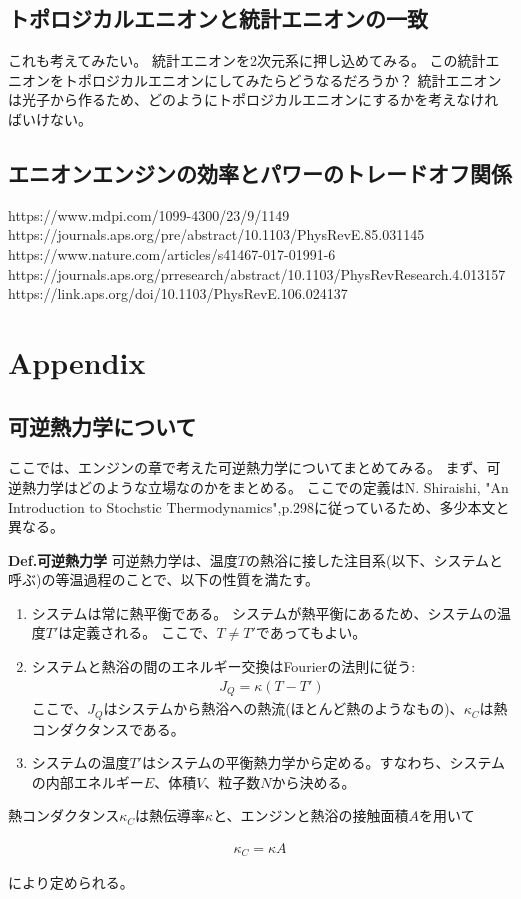 \documentclass[a4paper,11pt]{jsarticle}
\numberwithin{equation}{section}
\begin{document}
\subsection{トポロジカルエニオンと統計エニオンの一致}
これも考えてみたい。
統計エニオンを2次元系に押し込めてみる。
この統計エニオンをトポロジカルエニオンにしてみたらどうなるだろうか？
統計エニオンは光子から作るため、どのようにトポロジカルエニオンにするかを考えなければいけない。

\subsection{エニオンエンジンの効率とパワーのトレードオフ関係}
https://www.mdpi.com/1099-4300/23/9/1149\\
https://journals.aps.org/pre/abstract/10.1103/PhysRevE.85.031145\\
https://www.nature.com/articles/s41467-017-01991-6\\
https://journals.aps.org/prresearch/abstract/10.1103/PhysRevResearch.4.013157\\
https://link.aps.org/doi/10.1103/PhysRevE.106.024137\\



\section{Appendix}
\subsection{可逆熱力学について}
ここでは、エンジンの章で考えた可逆熱力学についてまとめてみる。
まず、可逆熱力学はどのような立場なのかをまとめる。
ここでの定義はN. Shiraishi, "An Introduction to Stochstic Thermodynamics",p.298に従っているため、多少本文と異なる。

\begin{itembox}[l]{\textbf{Def.可逆熱力学}}
可逆熱力学は、温度$T$の熱浴に接した注目系(以下、システムと呼ぶ)の等温過程のことで、以下の性質を満たす。
\begin{enumerate}
  \item システムは常に熱平衡である。
    システムが熱平衡にあるため、システムの温度$T'$は定義される。
    ここで、$T\neq T'$であってもよい。
  \item システムと熱浴の間のエネルギー交換はFourierの法則に従う:
    \begin{align}
      J_Q=\kappa(T-T')
    \end{align}
    ここで、$J_Q$はシステムから熱浴への熱流(ほとんど熱のようなもの)、$\kappa_C$は熱コンダクタンスである。
  \item システムの温度$T'$はシステムの平衡熱力学から定める。すなわち、システムの内部エネルギー$E$、体積$V$、粒子数$N$から決める。
\end{enumerate}
\end{itembox}

熱コンダクタンス$\kappa_C$は熱伝導率$\kappa$と、エンジンと熱浴の接触面積$A$を用いて

\begin{align}
  \kappa_C=\kappa A
\end{align}

により定められる。
\end{document}
